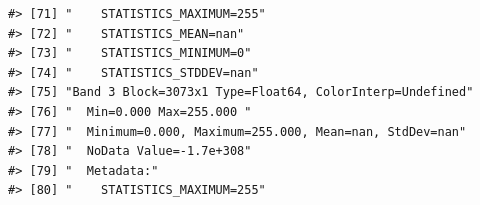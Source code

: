 \documentclass[
]{book}
\begin{document}
\begin{verbatim}
#> [71] "    STATISTICS_MAXIMUM=255"                                                                                                                                                                                                                                                     
#> [72] "    STATISTICS_MEAN=nan"                                                                                                                                                                                                                                                        
#> [73] "    STATISTICS_MINIMUM=0"                                                                                                                                                                                                                                                       
#> [74] "    STATISTICS_STDDEV=nan"                                                                                                                                                                                                                                                      
#> [75] "Band 3 Block=3073x1 Type=Float64, ColorInterp=Undefined"                                                                                                                                                                                                                        
#> [76] "  Min=0.000 Max=255.000 "                                                                                                                                                                                                                                                       
#> [77] "  Minimum=0.000, Maximum=255.000, Mean=nan, StdDev=nan"                                                                                                                                                                                                                         
#> [78] "  NoData Value=-1.7e+308"                                                                                                                                                                                                                                                       
#> [79] "  Metadata:"                                                                                                                                                                                                                                                                    
#> [80] "    STATISTICS_MAXIMUM=255"                                                                                                                                                                                                                                                     

\end{verbatim}
\end{document}
